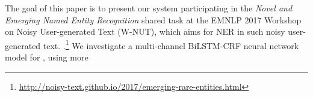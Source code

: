%

The goal of this paper is to present our system participating in the \textit{Novel and Emerging Named Entity Recognition} shared task at the EMNLP 2017 Workshop on Noisy User-generated Text (W-NUT), which aims for NER in such noisy user-generated text. .\footnote{\url{http://noisy-text.github.io/2017/emerging-rare-entities.html}}
We investigate a multi-channel BiLSTM-CRF neural network model for , using more 


